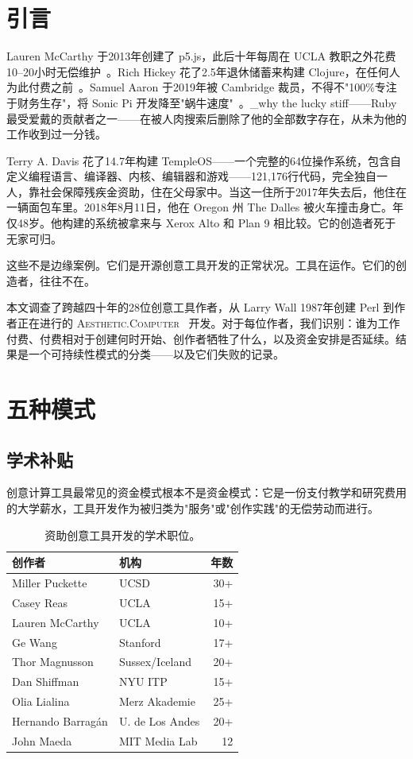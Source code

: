 \documentclass[10pt,letterpaper,twocolumn]{article}
\newcommand{\ac}{\textsc{Aesthetic.Computer}}
\begin{document}
\section{引言}

Lauren McCarthy 于2013年创建了 p5.js，此后十年每周在 UCLA 教职之外花费10--20小时无偿维护~\citep{mccarthy2023making}。Rich Hickey 花了2.5年退休储蓄来构建 Clojure，在任何人为此付费之前~\citep{hickey2020history}。Samuel Aaron 于2019年被 Cambridge 裁员，不得不"100\%专注于财务生存"，将 Sonic Pi 开发降至"蜗牛速度"~\citep{aaron2016sonic}。\_why the lucky stiff——Ruby 最受爱戴的贡献者之一——在被人肉搜索后删除了他的全部数字存在，从未为他的工作收到过一分钱。

Terry A. Davis 花了14.7年构建 TempleOS——一个完整的64位操作系统，包含自定义编程语言、编译器、内核、编辑器和游戏——121,176行代码，完全独自一人，靠社会保障残疾金资助，住在父母家中。当这一住所于2017年失去后，他住在一辆面包车里。2018年8月11日，他在 Oregon 州 The Dalles 被火车撞击身亡。年仅48岁。他构建的系统被拿来与 Xerox Alto 和 Plan 9 相比较。它的创造者死于无家可归。

这些不是边缘案例。它们是开源创意工具开发的正常状况。工具在运作。它们的创造者，往往不在。

本文调查了跨越四十年的28位创意工具作者，从 Larry Wall 1987年创建 Perl 到作者正在进行的 \ac{}~\citep{scudder2026ac} 开发。对于每位作者，我们识别：谁为工作付费、付费相对于创建何时开始、创作者牺牲了什么，以及资金安排是否延续。结果是一个可持续性模式的分类——以及它们失败的记录。

\section{五种模式}

\subsection{学术补贴}

创意计算工具最常见的资金模式根本不是资金模式：它是一份支付教学和研究费用的大学薪水，工具开发作为被归类为"服务"或"创作实践"的无偿劳动而进行。

\begin{table}[h]
\small
\centering
\begin{tabularx}{\columnwidth}{Xlr}
\toprule
\textbf{创作者} & \textbf{机构} & \textbf{年数} \\
\midrule
Miller Puckette & UCSD & 30+ \\
Casey Reas & UCLA & 15+ \\
Lauren McCarthy & UCLA & 10+ \\
Ge Wang & Stanford & 17+ \\
Thor Magnusson & Sussex/Iceland & 20+ \\
Dan Shiffman & NYU ITP & 15+ \\
Olia Lialina & Merz Akademie & 25+ \\
Hernando Barrag\'an & U. de Los Andes & 20+ \\
John Maeda & MIT Media Lab & 12 \\
\bottomrule
\end{tabularx}
\caption{资助创意工具开发的学术职位。}
\label{tab:academic}
\end{table}
\end{document}
